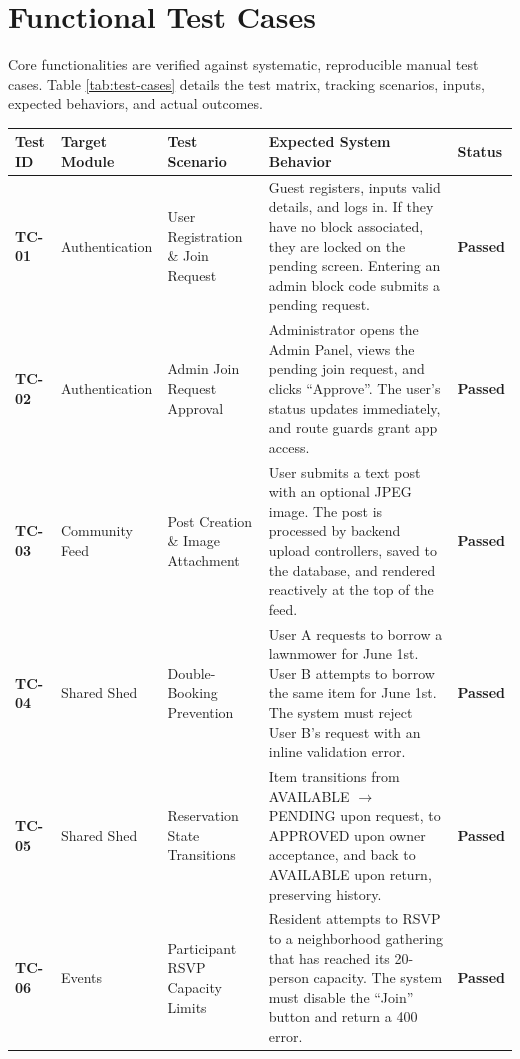 \section{Functional Test Cases}
Core functionalities are verified against systematic, reproducible manual test cases. Table \ref{tab:test-cases} details the test matrix, tracking scenarios, inputs, expected behaviors, and actual outcomes.

\begin{table}[htbp]
\centering
\scriptsize
\setlength{\tabcolsep}{3pt}
\renewcommand{\arraystretch}{1.3}
\begin{tabularx}{\textwidth}{|>{\raggedright\arraybackslash}p{1.0cm}|>{\raggedright\arraybackslash}p{1.8cm}|>{\raggedright\arraybackslash}p{2.8cm}|>{\raggedright\arraybackslash}X|p{1.0cm}|}
\hline
\textbf{Test ID} & \textbf{Target Module} & \textbf{Test Scenario} & \textbf{Expected System Behavior} & \textbf{Status} \\ \hline
\textbf{TC-01} & Authentication & User Registration \& Join Request & Guest registers, inputs valid details, and logs in. If they have no block associated, they are locked on the pending screen. Entering an admin block code submits a pending request. & \textbf{Passed} \\ \hline
\textbf{TC-02} & Authentication & Admin Join Request Approval & Administrator opens the Admin Panel, views the pending join request, and clicks ``Approve''. The user's status updates immediately, and route guards grant app access. & \textbf{Passed} \\ \hline
\textbf{TC-03} & Community Feed & Post Creation \& Image Attachment & User submits a text post with an optional JPEG image. The post is processed by backend upload controllers, saved to the database, and rendered reactively at the top of the feed. & \textbf{Passed} \\ \hline
\textbf{TC-04} & Shared Shed & Double-Booking Prevention & User A requests to borrow a lawnmower for June 1st. User B attempts to borrow the same item for June 1st. The system must reject User B's request with an inline validation error. & \textbf{Passed} \\ \hline
\textbf{TC-05} & Shared Shed & Reservation State Transitions & Item transitions from AVAILABLE $\to$ PENDING upon request, to APPROVED upon owner acceptance, and back to AVAILABLE upon return, preserving history. & \textbf{Passed} \\ \hline
\textbf{TC-06} & Events & Participant RSVP Capacity Limits & Resident attempts to RSVP to a neighborhood gathering that has reached its 20-person capacity. The system must disable the ``Join'' button and return a 400 error. & \textbf{Passed} \\ \hline

\end{tabularx}
\end{table}
